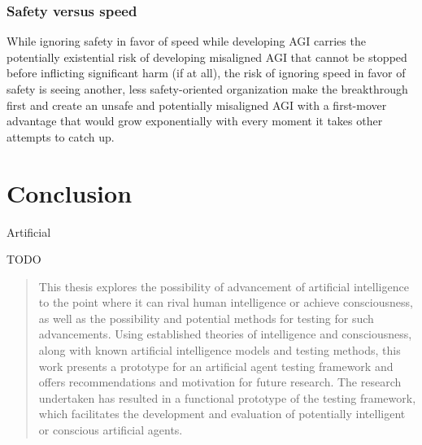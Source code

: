 \documentclass[masterthesis]{fer}
\begin{document}
\subsection{Safety versus speed}

While ignoring safety in favor of speed while developing AGI carries the potentially existential risk of developing misaligned AGI that cannot be stopped before inflicting significant harm (if at all),
the risk of ignoring speed in favor of safety is seeing another, less safety-oriented organization make the breakthrough first and create an unsafe and potentially misaligned AGI with a first-mover advantage that would grow exponentially with every moment it takes other attempts to catch up.

\chapter{Conclusion}
\label{chp:conclusion}

Artificial

TODO








\begin{abstract}
  This thesis explores the possibility of advancement of artificial intelligence to the point where it can rival human intelligence or achieve consciousness, as well as the possibility and potential methods for testing for such advancements.
Using established theories of intelligence and consciousness, along with known artificial intelligence models and testing methods, this work presents a prototype for an artificial agent testing framework and offers recommendations and motivation for future research.
The research undertaken has resulted in a functional prototype of the testing framework, which facilitates the development and evaluation of potentially intelligent or conscious artificial agents.

\end{abstract}
\end{document}
